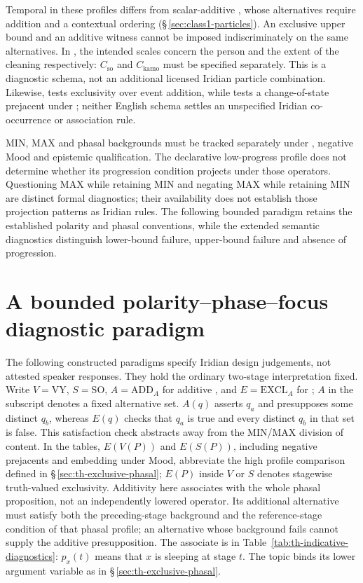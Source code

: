 Temporal  in these profiles differs from scalar-additive 
, whose alternatives require addition and a contextual ordering
(§\,\ref{sec:class1-particles}). An exclusive upper bound and an additive
witness cannot be imposed indiscriminately on the same alternatives. In
, the intended
scales concern the person and the extent of the cleaning respectively:
$C_{\mathrm{so}}$ and $C_{\mathrm{kamo}}$ must be specified separately.
This is a diagnostic schema, not an additional licensed Iridian particle
combination. Likewise, 
tests exclusivity over event addition, while  tests a change-of-state prejacent under ; neither
English schema settles an unspecified Iridian co-occurrence or association
rule.

MIN, MAX and phasal backgrounds must be tracked separately under ,
negative Mood and epistemic qualification. The declarative low-progress
profile does not determine whether its progression condition projects under
those operators. Questioning MAX while retaining MIN and negating MAX while
retaining MIN are distinct formal diagnostics; their availability does not
establish those projection patterns as Iridian rules. The following bounded
paradigm retains the established polarity and phasal conventions, while the
extended semantic diagnostics distinguish lower-bound failure, upper-bound
failure and absence of progression.


\section{A bounded polarity--phase--focus diagnostic paradigm}
\label{sec:th-polarity-diagnostics}

The following constructed paradigms specify Iridian design judgements, not
attested speaker responses. They hold the ordinary two-stage interpretation
fixed. Write $V=\mathrm{VY}$, $S=\mathrm{SO}$,
$A=\mathrm{ADD}_A$ for additive , and $E=\mathrm{EXCL}_A$ for
; $A$ in the subscript denotes a fixed alternative set.
$A(q)$ asserts $q_a$ and presupposes some distinct $q_b$, whereas $E(q)$
checks that $q_a$ is true and every distinct $q_b$ in that set is false.
This satisfaction check abstracts away from the MIN/MAX division of content. In the tables,
$E(V(P))$ and $E(S(P))$, including negative prejacents and embedding under
Mood, abbreviate the high profile comparison defined in
§\,\ref{sec:th-exclusive-phasal}; $E(P)$ inside $V$ or $S$ denotes
stagewise truth-valued exclusivity. Additivity here associates with the whole phasal proposition, not an independently lowered
operator. Its additional alternative must satisfy both the preceding-stage
background and the reference-stage condition of that phasal profile; an
alternative whose background fails cannot supply the additive presupposition.
The associate is  in Table~\ref{tab:th-indicative-diagnostics}:
$p_x(t)$ means that $x$ is sleeping at stage $t$. The topic binds its lower
argument variable as in §\,\ref{sec:th-exclusive-phasal}.

